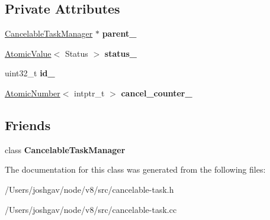 \subsection*{Private Attributes}
\begin{DoxyCompactItemize}
\item 
\hyperlink{classv8_1_1internal_1_1_cancelable_task_manager}{Cancelable\+Task\+Manager} $\ast$ {\bfseries parent\+\_\+}\hypertarget{classv8_1_1internal_1_1_cancelable_abad7c79303a70c380914d404ee737ab7}{}\label{classv8_1_1internal_1_1_cancelable_abad7c79303a70c380914d404ee737ab7}

\item 
\hyperlink{classv8_1_1internal_1_1_atomic_value}{Atomic\+Value}$<$ Status $>$ {\bfseries status\+\_\+}\hypertarget{classv8_1_1internal_1_1_cancelable_a19ddef77b9f081e42ae38a8ef6f261b8}{}\label{classv8_1_1internal_1_1_cancelable_a19ddef77b9f081e42ae38a8ef6f261b8}

\item 
uint32\+\_\+t {\bfseries id\+\_\+}\hypertarget{classv8_1_1internal_1_1_cancelable_a8fc156347d1bf3414f89f29d55513aee}{}\label{classv8_1_1internal_1_1_cancelable_a8fc156347d1bf3414f89f29d55513aee}

\item 
\hyperlink{classv8_1_1internal_1_1_atomic_number}{Atomic\+Number}$<$ intptr\+\_\+t $>$ {\bfseries cancel\+\_\+counter\+\_\+}\hypertarget{classv8_1_1internal_1_1_cancelable_a9cbfe593c65f651afd3952b4816b3241}{}\label{classv8_1_1internal_1_1_cancelable_a9cbfe593c65f651afd3952b4816b3241}

\end{DoxyCompactItemize}
\subsection*{Friends}
\begin{DoxyCompactItemize}
\item 
class {\bfseries Cancelable\+Task\+Manager}\hypertarget{classv8_1_1internal_1_1_cancelable_a76c51416f37d4d74c9557fb203b8ccf3}{}\label{classv8_1_1internal_1_1_cancelable_a76c51416f37d4d74c9557fb203b8ccf3}

\end{DoxyCompactItemize}


The documentation for this class was generated from the following files\+:\begin{DoxyCompactItemize}
\item 
/\+Users/joshgav/node/v8/src/cancelable-\/task.\+h\item 
/\+Users/joshgav/node/v8/src/cancelable-\/task.\+cc\end{DoxyCompactItemize}
